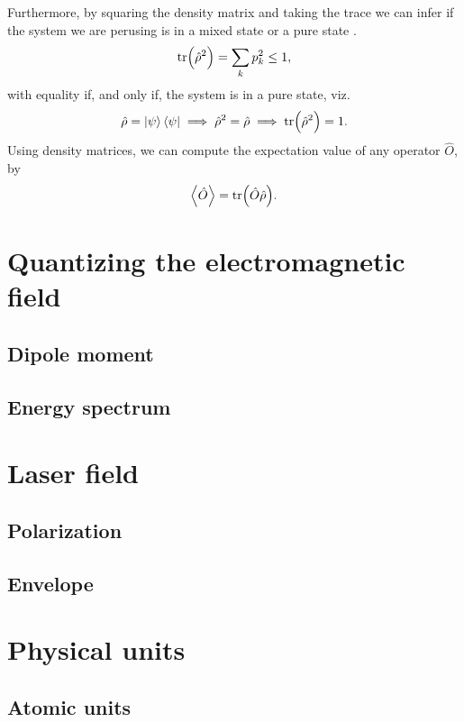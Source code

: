         Furthermore, by squaring the density matrix and taking the trace we can
        infer if the system we are perusing is in a mixed state or a pure state
        \cite{modern-qm}.
        \begin{align}
            \tr(\hat{\rho}^2) = \sum_{k} p_k^2 \leq 1,
        \end{align}
        with equality if, and only if, the system is in a pure state, viz.
        \begin{align}
            \hat{\rho} = \ket{\psi}\bra{\psi}
            \implies \hat{\rho}^2 = \hat{\rho}
            \implies \tr(\hat{\rho}^2) = 1.
        \end{align}
        Using density matrices, we can compute the expectation value of any
        operator $\hat{O}$, by \cite{modern-qm}
        \begin{align}
            \left\langle \hat{O} \right\rangle = \tr(\hat{O}\hat{\rho}).
        \end{align}

    \section{Quantizing the electromagnetic field}
        \subsection{Dipole moment}
        \subsection{Energy spectrum}

    \section{Laser field}
        \subsection{Polarization}
        \subsection{Envelope}

    \section{Physical units}
        \subsection{Atomic units}

